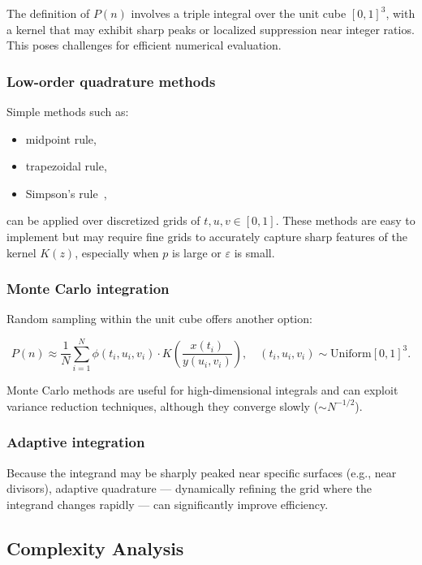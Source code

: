 \documentclass[12pt]{article}
\theoremstyle{definition}
\theoremstyle{plain}
\theoremstyle{remark}
\begin{document}
The definition of \( P(n) \) involves a triple integral over the unit cube \( [0,1]^3 \), with a kernel that may exhibit sharp peaks or localized suppression near integer ratios. This poses challenges for efficient numerical evaluation.

\subsubsection{Low-order quadrature methods}

Simple methods such as:
\begin{itemize}
  \item midpoint rule,
  \item trapezoidal rule,
  \item Simpson's rule~\cite{granville1995smooth},
\end{itemize}
can be applied over discretized grids of \( t, u, v \in [0,1] \). These methods are easy to implement but may require fine grids to accurately capture sharp features of the kernel \( K(z) \), especially when \( p \) is large or \( \varepsilon \) is small.

\subsubsection{Monte Carlo integration}

Random sampling within the unit cube offers another option:

\[
P(n) \approx \frac{1}{N} \sum_{i=1}^{N} \phi(t_i,u_i,v_i) \cdot K\left( \frac{x(t_i)}{y(u_i,v_i)} \right),
\quad (t_i,u_i,v_i) \sim \text{Uniform}[0,1]^3.
\]

Monte Carlo methods are useful for high-dimensional integrals and can exploit variance reduction techniques, although they converge slowly (\( \sim N^{-1/2} \)).

\subsubsection{Adaptive integration}

Because the integrand may be sharply peaked near specific surfaces (e.g., near divisors), adaptive quadrature — dynamically refining the grid where the integrand changes rapidly — can significantly improve efficiency.

\subsection{Complexity Analysis}
\end{document}
